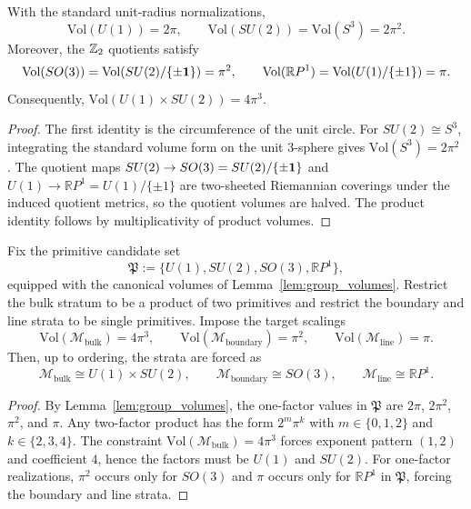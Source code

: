 \begin{lemma}\label{lem:group_volumes}
With the standard unit-radius normalizations,
\[
\mathrm{Vol}(U(1))=2\pi,\qquad
\mathrm{Vol}(SU(2))=\mathrm{Vol}(S^3)=2\pi^2.
\]
Moreover, the $\mathbb{Z}_2$ quotients satisfy
\[
\mathrm{Vol}(SO(3))=\mathrm{Vol}(SU(2)/\{\pm \mathbf{1}\})=\pi^2,\qquad
\mathrm{Vol}(\mathbb{R}P^1)=\mathrm{Vol}(U(1)/\{\pm 1\})=\pi.
\]
Consequently, $\mathrm{Vol}(U(1)\times SU(2))=4\pi^3$.
\end{lemma}
\begin{proof}
The first identity is the circumference of the unit circle.
For $SU(2)\cong S^3$, integrating the standard volume form on the unit $3$-sphere gives $\mathrm{Vol}(S^3)=2\pi^2$ \cite{Nakahara2003,HallLieGroups2015}.
The quotient maps $SU(2)\to SO(3)=SU(2)/\{\pm \mathbf{1}\}$ and $U(1)\to \mathbb{R}P^1=U(1)/\{\pm 1\}$ are two-sheeted Riemannian coverings under the induced quotient metrics, so the quotient volumes are halved.
The product identity follows by multiplicativity of product volumes.
\end{proof}

\begin{proposition}\label{prop:alpha_phase_factorization_rigidity}
Fix the primitive candidate set
\[
\mathfrak{P}:=\{U(1),SU(2),SO(3),\mathbb{R}P^1\},
\]
equipped with the canonical volumes of Lemma~\ref{lem:group_volumes}.
Restrict the bulk stratum to be a product of two primitives and restrict the boundary and line strata to be single primitives.
Impose the target scalings
\[
\mathrm{Vol}(\mathcal{M}_{\mathrm{bulk}})=4\pi^3,\qquad
\mathrm{Vol}(\mathcal{M}_{\mathrm{boundary}})=\pi^2,\qquad
\mathrm{Vol}(\mathcal{M}_{\mathrm{line}})=\pi.
\]
Then, up to ordering, the strata are forced as
\[
\mathcal{M}_{\mathrm{bulk}}\cong U(1)\times SU(2),\qquad
\mathcal{M}_{\mathrm{boundary}}\cong SO(3),\qquad
\mathcal{M}_{\mathrm{line}}\cong \mathbb{R}P^1.
\]
\end{proposition}
\begin{proof}
By Lemma~\ref{lem:group_volumes}, the one-factor values in $\mathfrak{P}$ are $2\pi$, $2\pi^2$, $\pi^2$, and $\pi$.
Any two-factor product has the form $2^m\pi^k$ with $m\in\{0,1,2\}$ and $k\in\{2,3,4\}$.
The constraint $\mathrm{Vol}(\mathcal{M}_{\mathrm{bulk}})=4\pi^3$ forces exponent pattern $(1,2)$ and coefficient $4$, hence the factors must be $U(1)$ and $SU(2)$.
For one-factor realizations, $\pi^2$ occurs only for $SO(3)$ and $\pi$ occurs only for $\mathbb{R}P^1$ in $\mathfrak{P}$, forcing the boundary and line strata.
\end{proof}

